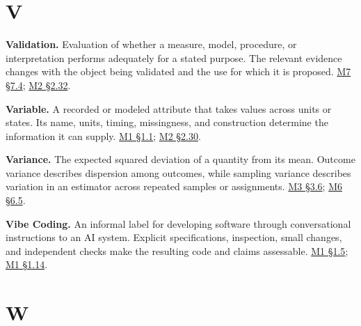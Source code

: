 \par{}
\hypertarget{module-v}{%
\section*{V}\label{module-v}}

\noindent\textbf{Validation.} Evaluation of whether a measure, model, procedure,
or interpretation performs adequately for a stated purpose. The relevant
evidence changes with the object being validated and the use for which
it is proposed.
\href{Marketing_Analytics_Lecture_Notes.pdf\#M07-validation-cross-validation-and-leakage}{M7
§7.4};
\href{Marketing_Analytics_Lecture_Notes.pdf\#M02-defining-harm-before-choosing-its-measure}{M2
§2.32}.

\noindent\textbf{Variable.} A recorded or modeled attribute that takes values
across units or states. Its name, units, timing, missingness, and
construction determine the information it can supply.
\href{Marketing_Analytics_Lecture_Notes.pdf\#M01-from-a-marketing-question-to-an-analytical-object}{M1
§1.1};
\href{Marketing_Analytics_Lecture_Notes.pdf\#M02-data-have-a-production-history}{M2
§2.30}.

\noindent\textbf{Variance.} The expected squared deviation of a quantity from its
mean. Outcome variance describes dispersion among outcomes, while
sampling variance describes variation in an estimator across repeated
samples or assignments.
\href{Marketing_Analytics_Lecture_Notes.pdf\#M03-uncertainty-dependence-and-practical-importance}{M3
§3.6};
\href{Marketing_Analytics_Lecture_Notes.pdf\#M06-power-precision-and-the-minimum-useful-effect}{M6
§6.5}.

\noindent\textbf{Vibe Coding.} An informal label for developing software through
conversational instructions to an AI system. Explicit specifications,
inspection, small changes, and independent checks make the resulting
code and claims assessable.
\href{Marketing_Analytics_Lecture_Notes.pdf\#M01-ai-assisted-coding-as-a-sequence-of-verifiable-steps}{M1
§1.5};
\href{Marketing_Analytics_Lecture_Notes.pdf\#M01-specifications-independent-checks-and-retained-skills}{M1
§1.14}.

\par{}
\hypertarget{module-w}{%
\section*{W}\label{module-w}}

